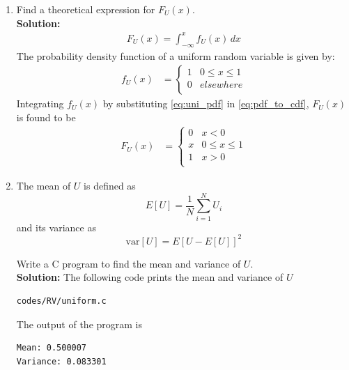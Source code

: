 \documentclass[journal,8pt,onecolumn]{IEEEtran}
\providecommand{\sbrak}[1]{\ensuremath{{}\left[#1\right]}}
\newcommand{\solution}{\noindent \textbf{Solution: }}
\begin{document}
\begin{enumerate}
%
\item
Find a  theoretical expression for $F_{U}(x)$.\\
\solution
\begin{align} 
F_{U}(x) = \int_{-\infty}^{x} f_{U}(x)\,dx
\label{eq:pdf_to_cdf}
\end{align}
The probability density function of a uniform random variable is given by: 
\begin{align}
	f_U(x) &= 
	\begin{cases}
	1 &  0 \le x \le  1
	\\
	0 & elsewhere
	\\
	\end{cases}
	\label{eq:uni_pdf}
\end{align}
Integrating $f_{U}(x)$ by substituting \eqref{eq:uni_pdf} in \eqref{eq:pdf_to_cdf}, $F_U(x)$ is found to be
\begin{align}
	F_U(x) &= 
	\begin{cases}
	0 & x < 0
	\\	
	x & 0 \le x \le  1
	\\
	1 & x > 0
	\\
	\end{cases}
	\label{eq:uni_cdf}
\end{align}

\item
\label{prob:print_uni}
The mean of $U$ is defined as
%
\begin{equation}
E\sbrak{U} = \frac{1}{N}\sum_{i=1}^{N}U_i
\end{equation}
%
and its variance as
%
\begin{equation}
\text{var}\sbrak{U} = E\sbrak{U- E\sbrak{U}}^2 
\end{equation}

Write a C program to  find the mean and variance of $U$.\\
\solution The following code prints the mean and variance of $U$
\begin{lstlisting}
codes/RV/uniform.c
\end{lstlisting}
The output of the program is
\begin{lstlisting}
Mean: 0.500007
Variance: 0.083301
\end{lstlisting}


\end{enumerate}
\end{document}

